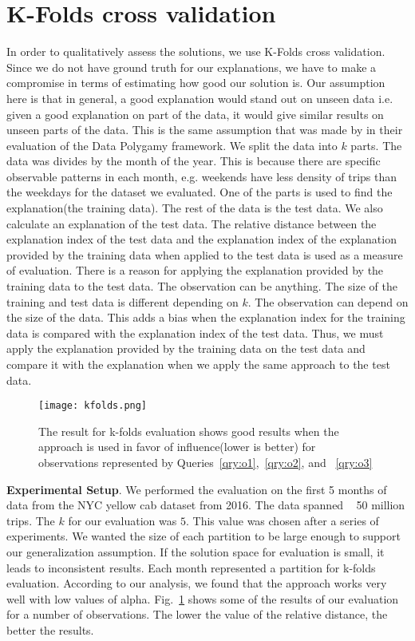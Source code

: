\section{K-Folds cross validation}
In order to qualitatively assess the solutions, we use K-Folds cross validation\citep{refaeilzadeh2009cross}. Since we do not have ground truth for our explanations, we have to make a compromise in terms of estimating how good our solution is. Our assumption here is that in general, a good explanation would stand out on unseen data i.e. given a good explanation on part of the data, it would give similar results on unseen parts of the data. This is the same assumption that was made by \cite{chirigati2016data} in their evaluation of the Data Polygamy framework. We split the data into $k$ parts. The data was divides by the month of the year. This is because there are specific observable patterns in each month, e.g. weekends have less density of trips than the weekdays for the dataset we evaluated. One of the parts is used to find the explanation(the training data). The rest of the data is the test data. We also calculate an explanation of the test data. The relative distance between the explanation index of the test data and the explanation index of the explanation provided by the training data when applied to the test data is used as a measure of evaluation.
There is a reason for applying the explanation provided by the training data to the test data. The observation can be anything. The size of the training and test data is different depending on $k$. The observation can depend on the size of the data. This adds a bias when the explanation index for the training data is compared with the explanation index of the test data. Thus, we must apply the explanation provided by the training data on the test data and compare it with the explanation when we apply the same approach to the test data.

\begin{figure}[h]
\texttt{[image: kfolds.png]}
\caption{The result for k-folds evaluation shows good results when the approach is used in favor of influence(lower is better) for observations represented by Queries~\ref{qry:o1},~\ref{qry:o2}, and ~\ref{qry:o3}}
\label{fig:kfolds}
\end{figure}

\textbf{Experimental Setup}. We performed the evaluation on the first 5 months of data from the NYC yellow cab dataset from 2016. The data spanned ~ 50 million trips. The $k$ for our evaluation was $5$. This value was chosen after a series of experiments. We wanted the size of each partition to be large enough to support our generalization assumption. If the solution space for evaluation is small, it leads to inconsistent results. Each month represented a partition for k-folds evaluation. According to our analysis, we found that the approach works very well with low values of alpha. Fig.~\ref{fig:kfolds} shows some of the results of our evaluation for a number of observations. The lower the value of the relative distance, the better the results.

